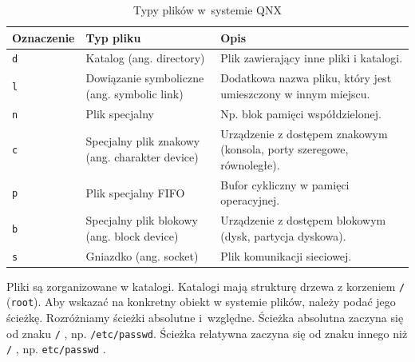 \documentclass[11pt,twoside,a4paper]{article}
\begin{document}
\begin{table}[h!]
\centering
\caption{Typy plików w~systemie QNX}
\setlength{\arrayrulewidth}{1pt}
\setlength{\tabcolsep}{6pt}
\renewcommand{\arraystretch}{1.2}
\begin{tabular}{ |p{}|p{}|p{}| }
\hline \rowcolor{gray}
\textbf{Oznaczenie} & \textbf{Typ pliku} & \textbf{Opis} \\ \hline
\mbox{\lstinline{d}} & Katalog (ang. directory) & Plik zawierający inne pliki i katalogi. \\ \hline
\mbox{\lstinline{l}} & Dowiązanie symboliczne (ang. symbolic link) & Dodatkowa nazwa pliku, który jest umieszczony w innym miejscu. \\ \hline
\mbox{\lstinline{n}} & Plik specjalny & Np. blok pamięci współdzielonej. \\ \hline
\mbox{\lstinline{c}} & Specjalny plik znakowy (ang. charakter device) & Urządzenie z dostępem znakowym (konsola, porty szeregowe, równoległe). \\ \hline
\mbox{\lstinline{p}} & Plik specjalny FIFO & Bufor cykliczny w pamięci operacyjnej. \\ \hline
\mbox{\lstinline{b}} & Specjalny plik blokowy (ang. block device) & Urządzenie z dostępem blokowym (dysk, partycja dyskowa). \\ \hline
\mbox{\lstinline{s}} & Gniazdko (ang. socket)	 & Plik komunikacji sieciowej. \\ \hline
\end{tabular}
\label{tab:typyplikow}
\end{table}


Pliki są zorganizowane w katalogi. Katalogi mają strukturę drzewa z korzeniem \lstinline{/} (\lstinline{root}). Aby wskazać na konkretny obiekt w systemie plików, należy podać jego ścieżkę. Rozróżniamy ścieżki absolutne i~względne. Ścieżka absolutna zaczyna się od znaku \lstinline{/} , np. \lstinline{/etc/passwd}. Ścieżka relatywna zaczyna się od znaku innego niż \lstinline{/} , np. \lstinline{etc/passwd} .
\end{document}
